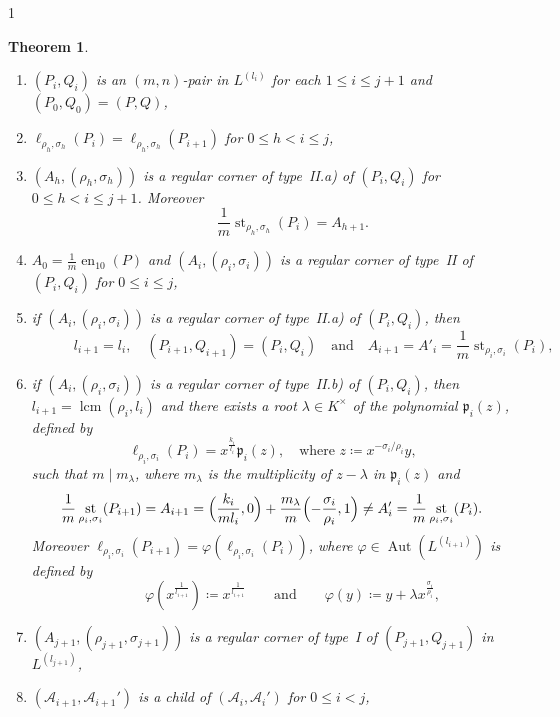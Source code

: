 \documentclass[reqno,a4paper,twoside]{amsart}
\newtheorem{theorem}{Theorem}[section]
\theoremstyle{definition}
\theoremstyle{remark}
\DeclareMathOperator{\Aut}{Aut}
\DeclareMathOperator{\en}{en}
\DeclareMathOperator{\st}{st}
\DeclareMathOperator{\lcm}{lcm}
\begin{document}
\begin{spacing}{1}
\begin{theorem}
\begin{enumerate}[itemsep=0.5675ex,topsep=0.5675ex]
\item $(P_i,Q_i)$ is an $(m,n)$-pair in $L^{(l_i)}$ for each $1\le i\le j+1$ and $(P_0,Q_0) = (P,Q)$,

\item $\ell_{\rho_h,\sigma_h}(P_i) = \ell_{\rho_h,\sigma_h}(P_{i+1})$ for $0\le h<i\le j$,

\item $(A_h,(\rho_h,\sigma_h))$ is a regular corner of type~II.a) of $(P_i,Q_i)$ for $0\le h < i\le j+1$. Moreover
$$
\qquad\quad \frac 1m \st_{\rho_h,\sigma_h}(P_i) = A_{h+1}.
$$

\item $A_0 = \frac{1}{m}\en_{10}(P)$ and $(A_i,(\rho_i,\sigma_i))$ is a regular corner of type~II of $(P_i,Q_i)$ for $0\le i\le j$,

\item if $(A_i,(\rho_i,\sigma_i))$ is a regular corner of type~II.a) of $(P_i,Q_i)$, then
$$
\quad\qquad l_{i+1} = l_i,\quad (P_{i+1},Q_{i+1}) = (P_i,Q_i)\quad \text{and}\quad A_{i+1}=A'_i=\frac{1}{m}\st_{\rho_i,\sigma_i}(P_i),
$$

\item if $(A_i,(\rho_i,\sigma_i))$ is a regular corner of type~II.b) of $(P_i,Q_i)$, then $l_{i+1} = \lcm(\rho_i,l_i)$ and there exists a root $\lambda\in K^{\times}$ of the polynomial $\mathfrak{p}_i(z)$, defined by
    $$
    \ell_{\rho_i,\sigma_i}(P_i) = x^{\frac{k_i}{l_i}} \mathfrak{p}_i(z),\quad\text{where $z\coloneqq x^{-\sigma_i/\rho_i}y$,}
    $$
    such that $m\mid m_{\lambda}$, where $m_{\lambda}$ is the multiplicity of $z-\lambda$ in $\mathfrak{p}_i(z)$ and
    \begin{equation}\label{eq2}
    \frac{1}{m}\st_{\rho_i,\sigma_i}(P_{i+1}) = A_{i+1} = \Bigl(\frac{k_i}{m l_i},0\Bigr) + \frac{m_{\lambda}}{m}\Bigl(-\frac{\sigma_i}{\rho_i},1\Bigr)\ne A'_i=\frac{1}{m}\st_{\rho_i,\sigma_i}(P_i).
    \end{equation}
    Moreover $\ell_{\rho_i,\sigma_i}(P_{i+1}) = \varphi(\ell_{\rho_i,\sigma_i}(P_i))$, where $\varphi\in \Aut(L^{(l_{i+1})})$ is defined by
    $$
    \qquad\quad \varphi(x^{\frac{1}{l_{i+1}}})\coloneqq x^{\frac{1}{l_{i+1}}}\qquad\text{and}\qquad \varphi(y)\coloneqq y + \lambda x^{\frac{\sigma_i}{\rho_i}},
    $$

\item $(A_{j+1},(\rho_{j+1},\sigma_{j+1}))$ is a regular corner of type~I of $(P_{j+1},Q_{j+1})$ in $L^{(l_{j+1})}$,

\item $(\mathcal{A}_{i+1},\mathcal{A}_{i+1}')$ is a child of $(\mathcal{A}_i,\mathcal{A}_i')$ for $0\le i<j$,


\end{enumerate}
\end{theorem}
\end{spacing}
\end{document}
